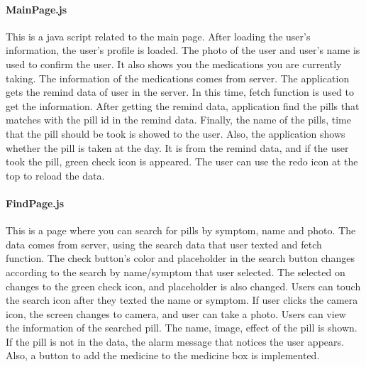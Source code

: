 \documentclass[conference]{IEEEtran}
\begin{document}
\paragraph{MainPage.js}
This is a java script related to the main page. After loading the user's information, the user's profile is loaded. The photo of the user and user's name is used to confirm the user. It also shows you the medications you are currently taking. The information of the medications comes from server. The application gets the remind data of user in the server. In this time, fetch function is used to get the information. After getting the remind data, application find the pills that matches with the pill id in the remind data. Finally, the name of the pills, time that the pill should be took is showed to the user. Also, the application shows whether the pill is taken at the day. It is from the remind data, and if the user took the pill, green check icon is appeared. The user can use the redo icon at the top to reload the data.   \\

\paragraph{FindPage.js}
This is a page where you can search for pills by symptom, name and photo. The data comes from server, using the search data that user texted and fetch function. The check button's color and placeholder in the search button changes according to the search by name/symptom that user selected. The selected on changes to the green check icon, and placeholder is also changed. Users can touch the search icon after they texted the name or symptom. If user clicks the camera icon, the screen changes to camera, and user can take a photo. Users can view the information of the searched pill. The name, image, effect of the pill is shown. If the pill is not in the data, the alarm message that notices the user appears. Also, a button to add the medicine to the medicine box is implemented.\\
\end{document}
